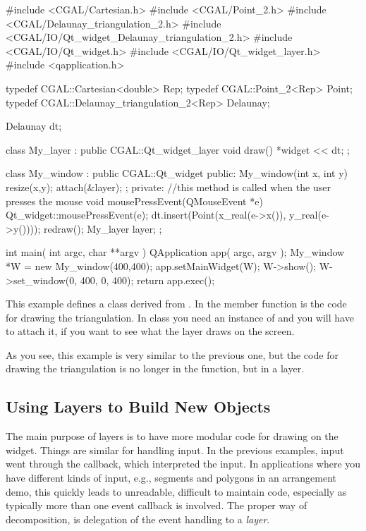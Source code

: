 \ccExample
\begin{ccExampleCode}
#include <CGAL/Cartesian.h>
#include <CGAL/Point_2.h>
#include <CGAL/Delaunay_triangulation_2.h>
#include <CGAL/IO/Qt_widget_Delaunay_triangulation_2.h>
#include <CGAL/IO/Qt_widget.h>
#include <CGAL/IO/Qt_widget_layer.h>
#include <qapplication.h>

typedef CGAL::Cartesian<double>		    Rep;
typedef CGAL::Point_2<Rep>		    Point;
typedef CGAL::Delaunay_triangulation_2<Rep> Delaunay;

Delaunay dt;

class My_layer : public CGAL::Qt_widget_layer{
  void draw(){
    *widget << dt;
  }
};

class My_window : public CGAL::Qt_widget {
public:
  My_window(int x, int y)
  {
    resize(x,y);
    attach(&layer);
  };
private:
  //this method is called when the user presses the mouse
  void mousePressEvent(QMouseEvent *e)
  {
    Qt_widget::mousePressEvent(e);
    dt.insert(Point(x_real(e->x()), y_real(e->y())));
    redraw();
  }
  My_layer layer;
};

int main( int argc, char **argv )
{
    QApplication app( argc, argv );
    My_window *W = new My_window(400,400);
    app.setMainWidget(W);
    W->show();
    W->set_window(0, 400, 0, 400);
    return app.exec();
}
\end{ccExampleCode}

This example defines a class derived from
. In the member function 
is the code for drawing the triangulation. In 
class you need an instance of  and you will 
have to attach it, if you want to see what the layer draws on the
screen.

As you see, this example is very similar to the previous one, but
the code for drawing the triangulation is no longer in the
 function, but in a layer.



\subsection{Using Layers to Build New Objects }
\label{Qt_widget_tools}

The main purpose of layers is to have more modular code for drawing on
the widget. Things are similar for handling input. In the previous
examples, input went through the 
callback, which interpreted the input. In applications where you have
different kinds of input, e.g., segments and polygons in an
arrangement demo, this quickly leads to unreadable, difficult to maintain
code,  especially as typically more than one event callback is
involved. The proper way of decomposition, is delegation
of the event handling to a {\em layer}. 

